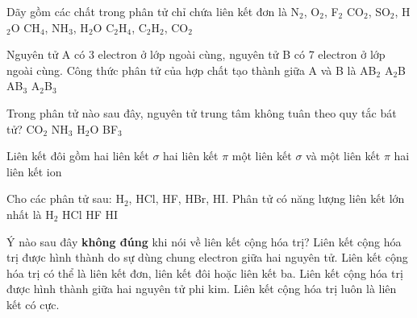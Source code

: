 \begin{ex}
	Dãy gồm các chất trong phân tử chỉ chứa liên kết đơn là
	\choice
	{N$_2$, O$_2$, F$_2$}
	{CO$_2$, SO$_2$, H$_2$O}
	{\True CH$_4$, NH$_3$, H$_2$O}
	{C$_2$H$_4$, C$_2$H$_2$, CO$_2$}
\end{ex}
\begin{ex}
	Nguyên tử A có 3 electron ở lớp ngoài cùng, nguyên tử B có 7 electron ở lớp ngoài cùng. Công thức phân tử của hợp chất tạo thành giữa A và B là
	\choice
	{AB$_2$}
	{A$_2$B}
	{AB$_3$}
	{\True A$_2$B$_3$}
\end{ex}
\begin{ex}
	Trong phân tử nào sau đây, nguyên tử trung tâm không tuân theo quy tắc bát tử?
	\choice
	{CO$_2$}
	{NH$_3$}
	{H$_2$O}
	{\True BF$_3$}
\end{ex}
\begin{ex}
	Liên kết đôi gồm
	\choice
	{hai liên kết $\sigma$}
	{hai liên kết $\pi$}
	{\True một liên kết $\sigma$ và một liên kết $\pi$}
	{hai liên kết ion}
\end{ex}
\begin{ex}
	Cho các phân tử sau: H$_2$, HCl, HF, HBr, HI. Phân tử có năng lượng liên kết lớn nhất là
	\choice
	{H$_2$}
	{HCl}
	{\True HF}
	{HI}
\end{ex}
\begin{ex}
	Ý nào sau đây \textbf{không đúng} khi nói về liên kết cộng hóa trị?
	\choice
	{Liên kết cộng hóa trị được hình thành do sự dùng chung electron giữa hai nguyên tử.}
	{Liên kết cộng hóa trị có thể là liên kết đơn, liên kết đôi hoặc liên kết ba.}
	{Liên kết cộng hóa trị được hình thành giữa hai nguyên tử phi kim.}
	{\True Liên kết cộng hóa trị luôn là liên kết có cực.}
\end{ex}
